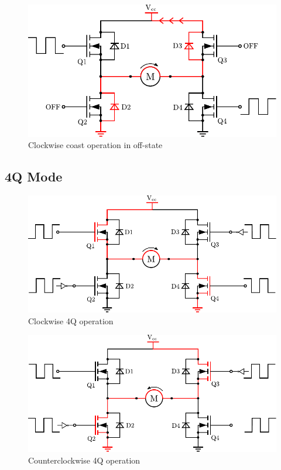 \begin{figure}[H]
	\centering
	\includegraphics[scale=.6]{figures/HbridgeClockwiseCoastRegen.pdf}
	\flushleft
	\caption{Clockwise coast operation in off-state}
	\label{HbridgeClokwiseCoastRegen}
\end{figure}

\subsection{4Q Mode}

\begin{figure}[H]
	\centering
	\includegraphics[scale=.6]{figures/HbridgeClockwise4Q.pdf}
	\flushleft
	\caption{Clockwise 4Q operation}
	\label{HbridgeClokwise4Q}
\end{figure}

\begin{figure}[H]
	\centering
	\includegraphics[scale=.6]{figures/HbridgeCounterClockwise4Q.pdf}
	\flushleft
	\caption{Counterclockwise 4Q operation}
	\label{HbridgeCounterClokwise4Q}
\end{figure}

